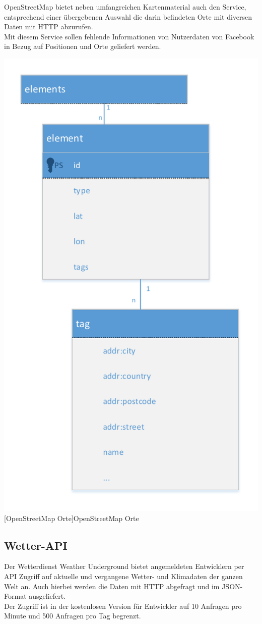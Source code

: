 \documentclass[a4paper,12pt]{scrartcl}
\begin{document}
OpenStreetMap bietet neben umfangreichen Kartenmaterial auch den Service, entsprechend einer übergebenen Auswahl die darin befindeten Orte mit diversen Daten mit HTTP abzurufen.\\
Mit diesem Service sollen fehlende Informationen von Nutzerdaten von Facebook in Bezug auf Positionen und Orte geliefert werden.

\begin{center}
\centering
\includegraphics[width=0.5\hsize]{../OSM.pdf}%
[OpenStreetMap Orte]{OpenStreetMap Orte}%
\end{center}



\subsection{Wetter-API}

Der Wetterdienst Weather Underground bietet angemeldeten Entwicklern per API Zugriff auf aktuelle und vergangene Wetter- und Klimadaten der ganzen Welt an. Auch hierbei werden die Daten mit HTTP abgefragt und im JSON-Format ausgeliefert.\\
Der Zugriff ist in der kostenlosen Version für Entwickler auf 10 Anfragen pro Minute und 500 Anfragen pro Tag begrenzt.
\end{document}
